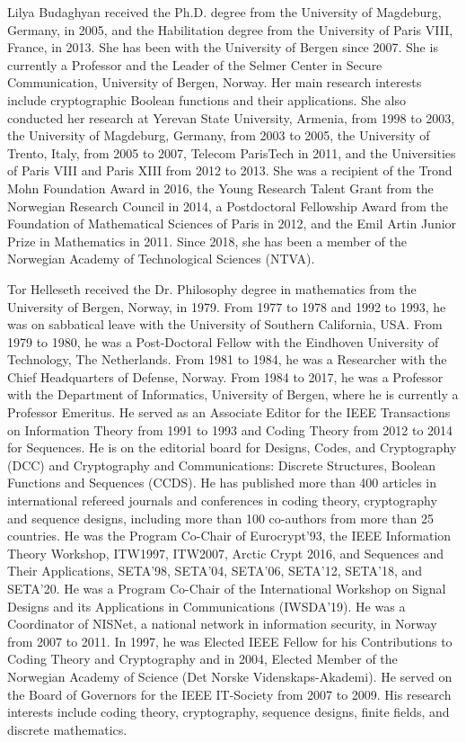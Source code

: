 \documentclass[10pt]{article}
\begin{document}
Lilya Budaghyan received the Ph.D. degree from the University of Magdeburg, Germany, in 2005, and the Habilitation degree from the University of Paris VIII, France, in 2013. She has been with the University of Bergen since 2007. She is currently a Professor and the Leader of the Selmer Center in Secure Communication, University of Bergen, Norway. Her main research interests include cryptographic Boolean functions and their applications. She also conducted her research at Yerevan State University, Armenia, from 1998 to 2003, the University of Magdeburg, Germany, from 2003 to 2005, the University of Trento, Italy, from 2005 to 2007, Telecom ParisTech in 2011, and the Universities of Paris VIII and Paris XIII from 2012 to 2013. She was a recipient of the Trond Mohn Foundation Award in 2016, the Young Research Talent Grant from the Norwegian Research Council in 2014, a Postdoctoral Fellowship Award from the Foundation of Mathematical Sciences of Paris in 2012, and the Emil Artin Junior Prize in Mathematics in 2011. Since 2018, she has been a member of the Norwegian Academy of Technological Sciences (NTVA).

Tor Helleseth received the Dr. Philosophy degree in mathematics from the University of Bergen, Norway, in 1979. From 1977 to 1978 and 1992 to 1993, he was on sabbatical leave with the University of Southern California, USA. From 1979 to 1980, he was a Post-Doctoral Fellow with the Eindhoven University of Technology, The Netherlands. From 1981 to 1984, he was a Researcher with the Chief Headquarters of Defense, Norway. From 1984 to 2017, he was a Professor with the Department of Informatics, University of Bergen, where he is currently a Professor Emeritus. He served as an Associate Editor for the IEEE Transactions on Information Theory from 1991 to 1993 and Coding Theory from 2012 to 2014 for Sequences. He is on the editorial board for Designs, Codes, and Cryptography (DCC) and Cryptography and Communications: Discrete Structures, Boolean Functions and Sequences (CCDS). He has published more than 400 articles in international refereed journals and conferences in coding theory, cryptography and sequence designs, including more than 100 co-authors from more than 25 countries. He was the Program Co-Chair of Eurocrypt'93, the IEEE Information Theory Workshop, ITW1997, ITW2007, Arctic Crypt 2016, and Sequences and Their Applications, SETA'98, SETA'04, SETA'06, SETA'12, SETA'18, and SETA'20. He was a Program Co-Chair of the International Workshop on Signal Designs and its Applications in Communications (IWSDA'19). He was a Coordinator of NISNet, a national network in information security, in Norway from 2007 to 2011. In 1997, he was Elected IEEE Fellow for his Contributions to Coding Theory and Cryptography and in 2004, Elected Member of the Norwegian Academy of Science (Det Norske Videnskaps-Akademi). He served on the Board of Governors for the IEEE IT-Society from 2007 to 2009. His research interests include coding theory, cryptography, sequence designs, finite fields, and discrete mathematics.
\end{document}

